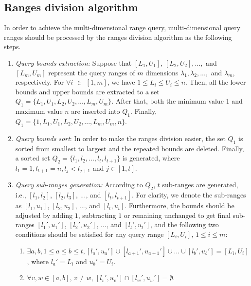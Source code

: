 \documentclass[IEEE JOURNAL OF BIOMEDICAL AND HEALTH INFORMATICS]{IEEEtran}
\begin{document}
\subsection{Ranges division algorithm}\label{sections division}
In order to achieve the multi-dimensional range query, multi-dimensional query ranges should be processed by the ranges division algorithm as the following steps. 
\begin{enumerate}
	\item \emph{Query bounds extraction:} Suppose that $[L_1, U_1]$, $ [L_2, U_2],... ,$ and $[L_m, U_m]$ represent the query ranges of $m$ dimensions $\lambda_1, \lambda_2, ... ,$ and $\lambda_m$, respectively. For $\forall i$ $\in$ $ [1, m]$, we have $ 1 \le L_i \le U_i \le n$. Then, all the lower bounds and upper bounds are extracted to a set $Q_1=\{L_1 , U_1, L_2, U_2, ... , L_m, U_m\}$. After that, both the minimum value 1 and maximum value $n$ are inserted into $Q_1$. Finally, $Q_1=\{1, L_1 , U_1, L_2, U_2, ... , L_m, U_m, n\}$.
	\item \emph{Query bounds sort}: In order to make the ranges division easier, the set $Q_1$ is sorted from smallest to largest and the repeated bounds are deleted. Finally, a sorted set $Q_2=\{l_1, l_2, ... , l_t, l_{t+1}\}$ is generated, where $l_1=1, l_{t+1}=n, l_j < l_{j+1}$ and $j \in [1, t]$.
	\item \emph{Query sub-ranges generation:} According to $Q_2$, $t$ sub-ranges are generated, i.e., $[l_1, l_2]$, $[l_2, l_3]$, $... $, and $[l_t, l_{t+1}]$. For clarity, we denote the sub-ranges as $[l_1, u_1]$, $[l_2, u_2]$, $... $, and $[l_t, u_t]$. Furthermore, the bounds should be adjusted by adding $1$, subtracting $1$ or remaining unchanged to get final sub-ranges $[l_1', u_1']$, $[l_2', u_2']$, $... $, and $[l_t', u_t'
	]$, and the following two conditions should be satisfied for any query range $[L_i, U_i]$, $1\le i \le m$:
	\begin{enumerate}
		\item $\exists a, b, 1 \le a \le b \le t, [l_a',u_a'] \cup [l_{a+1}', u_{a+1}'] \cup ...  \cup [l_b', u_b'] = [L_i, U_i]$, where $l_a' = L_i$ and $u_b'=U_i$.
		\item $\forall v,w \in [a, b]$, $v \neq w$, $[l_v', u_v']\cap [l_w', u_w'] = \emptyset$. 
	\end{enumerate}	 
	 
\end{enumerate} 
                                             
\end{document}
